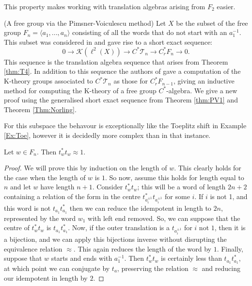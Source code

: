 This property makes working with translation algebras arising from $F_{2}$ easier.

\begin{example}\label{ex:PV}(A free group via the Pimsner-Voiculescu method)
Let $X$ be the subset of the free group $F_{n}=\langle a_{1},...,a_{n} \rangle$ consisting of all the words that do not start with an $a_{1}^{-1}$. This subset was considered in \cite{MR670181} and gave rise to a short exact sequence:
\begin{equation*}
0 \rightarrow \mathcal{K}(\ell^{2}(X)) \rightarrow C^{*}\mathcal{T}_{n} \rightarrow C^{*}_{r}F_{n} \rightarrow 0.
\end{equation*}
This sequence is the translation algebra sequence that arises from Theorem \ref{thm:T4}. In addition to this sequence the authors of \cite{MR670181} gave a computation of the K-theory groups associated to $C^{*}\mathcal{T}_{n}$ as those for $C^{*}_{r}F_{n-1}$, giving an inductive method for computing the K-theory of a free group $C^{*}$-algebra. We give a new proof using the generalised short exact sequence from Theorem \ref{thm:PV1} and Theorem \ref{Thm:Norling}.

For this subspace the behavour is exceptionally like the Toeplitz shift in Example \ref{Ex:Toe}, however it is decidedly more complex than in that instance.

\begin{claim}
Let $w \in F_{n}$. Then $t_{w}^{*}t_{w}\approx 1$.
\end{claim}
\begin{proof}
We will prove this by induction on the length of $w$. This clearly holds for the case when the length of $w$ is $1$. So now, assume this holds for length equal to $n$ and let $w$ have length $n+1$. Consider $t_{w}^{*}t_{w}$; this will be a word of length $2n+2$ containing a relation of the form in the centre $t_{a_{i}^{\pm 1}}^{*}t_{a_{i}^{\pm 1}}$ for some $i$. If $i$ is not 1, and this word is not $t_{a_{1}}t_{a_{1}}^{*}$ then we can reduce the idempotent in length to $2n$, represented by the word $w_{1}$ with left end removed. So, we can suppose that the centre of $t_{w}^{*}t_{w}$ is $t_{a_{1}}t_{a_{1}}^{*}$. Now, if the outer translation is a $t_{a_{i}^{\pm 1}}$ for $i$ not $1$, then it is a bijection, and we can apply this bijections inverse without disrupting the equivalence relation $\approx$. This again reduces the length of the word by $1$. Finally, suppose that $w$ starts and ends with $a_{1}^{-1}$. Then $t_{w}^{*}t_{w}$ is certainly less than $t_{a_{1}}t_{a_{1}}^{*}$, at which point we can conjugate by $t_{a}$, preserving the relation $\approx$ and reducing our idempotent in length by $2$. 
\end{proof}


\end{example}
